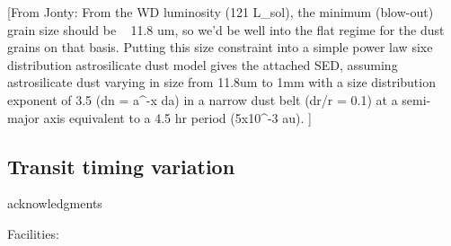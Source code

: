 \documentclass[iop,useAMES,usenatbig]{emulateapj}
\begin{document}
[From Jonty: From the WD luminosity (121 L_sol), the minimum (blow-out) grain size should be ~ 11.8 um, so we’d be well into the flat regime for the dust grains on that basis. Putting this size constraint into a simple power law sixe distribution astrosilicate dust model gives the attached SED, assuming astrosilicate dust varying in size from 11.8um to 1mm with a size distribution exponent of 3.5 (dn = a^-x da) in a narrow dust belt (dr/r = 0.1) at a semi-major axis equivalent to a 4.5 hr period (5x10^-3 au). ]

\subsection{Transit timing variation}





\acknowledgments
acknowledgments

Facilities: 



\end{document}
